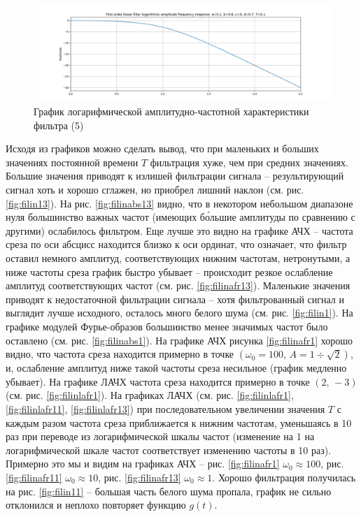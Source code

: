 \documentclass[a4paper, 12pt]{article}
\begin{document}
    \begin{figure}[H]
        \centering
        \includegraphics[scale=0.4]{5_lafr_filtered_linear.png}
        \captionsetup{skip=0pt}
        \caption{График логарифмической амплитудно-частотной характеристики фильтра (5)}
        \label{fig:filinlafr15}
    \end{figure}


    Исходя из графиков можно сделать вывод, что при маленьких и больших значениях постоянной времени $T$ фильтрация хуже,
    чем при средних значениях. Большие значения приводят к излишей фильтрации сигнала -- результирующий сигнал хоть и хорошо
    сглажен, но приобрел лишний наклон (см. рис. \ref{fig:filin13}). На рис. \ref{fig:filinabs13} видно, что в некотором
    небольшом диапазоне нуля большинство важных частот (имеющих б\'{о}льшие амплитуды по сравнению с другими) ослабилось
    фильтром. Еще лучше это видно на графике АЧХ -- частота среза по оси абсцисс находится близко к оси ординат, что означает,
    что фильтр оставил немного амплитуд, соответствующих нижним частотам, нетронутыми, а ниже частоты среза график быстро убывает
    -- происходит резкое ослабление амплитуд соответствующих частот (см. рис. \ref{fig:filinafr13}). Маленькие значения приводят к
    недостаточной фильтрации сигнала -- хотя фильтрованный сигнал и выглядит лучше исходного, осталось много белого шума
    (см. рис. \ref{fig:filin1}). На графике модулей Фурье-образов большинство менее значимых частот было оставлено
    (см. рис. \ref{fig:filinabs1}). На графике АЧХ рисунка \ref{fig:filinafr1} хорошо видно, что частота среза
    находится примерно в точке $\left(\omega_0=100,\,A=1\div\sqrt{2}\right)$, и, ослабление амплитуд ниже такой частоты среза несильное
    (график медленно убывает). На графике ЛАЧХ частота среза находится примерно в точке $\left(2,\,-3\right)$ (см. рис. \ref{fig:filinlafr1}).
    На графиках ЛАЧХ (см. рис. \ref{fig:filinlafr1}, \ref{fig:filinlafr11}, \ref{fig:filinlafr13})
    при последовательном увеличении значения $T$ с каждым разом частота среза приближается к нижним частотам, уменьшаясь в 10 раз при
    переводе из логарифмической шкалы частот (изменение на 1 на логарифмической шкале частот соответствует изменению частоты в 10 раз).
    Примерно это мы и видим на графиках АЧХ -- рис. \ref{fig:filinafr1} $\omega_0\approx 100$, рис. \ref{fig:filinafr11} $\omega_0\approx 10$,
    рис. \ref{fig:filinafr13} $\omega_0\approx 1$. Хорошо фильтрация получилась на рис. \ref{fig:filin11} -- большая часть белого шума пропала,
    график не сильно отклонился и неплохо повторяет функцию $g(t)$.
    
\end{document}
